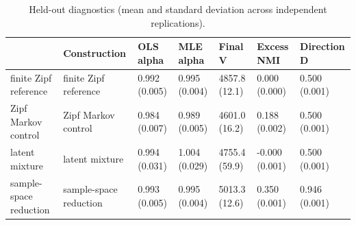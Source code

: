 \begin{table}

\caption{\label{tab:strict-summary-table}Held-out diagnostics (mean and standard deviation across independent replications).}
\centering
\begin{tabular}[t]{lllllll}
\toprule
  & Construction & OLS alpha & MLE alpha & Final V & Excess NMI & Direction D\\
\midrule
finite Zipf reference & finite Zipf reference & 0.992 (0.005) & 0.995 (0.004) & 4857.8 (12.1) & 0.000 (0.000) & 0.500 (0.001)\\
Zipf Markov control & Zipf Markov control & 0.984 (0.007) & 0.989 (0.005) & 4601.0 (16.2) & 0.188 (0.002) & 0.500 (0.001)\\
latent mixture & latent mixture & 0.994 (0.031) & 1.004 (0.029) & 4755.4 (59.9) & -0.000 (0.001) & 0.500 (0.001)\\
sample-space reduction & sample-space reduction & 0.993 (0.005) & 0.995 (0.004) & 5013.3 (12.6) & 0.350 (0.001) & 0.946 (0.001)\\
\bottomrule
\end{tabular}
\end{table}
